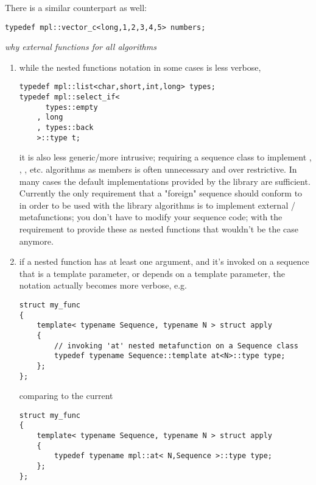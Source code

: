 \documentclass{netobjectdays}
\begin{document}
There is a similar  counterpart as well:

{\footnotesize
\begin{verbatim}
typedef mpl::vector_c<long,1,2,3,4,5> numbers;
\end{verbatim}
}


\emph{why external functions for all algorithms}

\begin{enumerate}
 \item while the nested functions notation in some cases is 
 less verbose, 

{\footnotesize
\begin{verbatim}
typedef mpl::list<char,short,int,long> types;
typedef mpl::select_if<
      types::empty
    , long
    , types::back
    >::type t;
\end{verbatim}
}

it is also less generic/more intrusive; requiring a sequence 
class to implement , , , etc. 
algorithms as members is often unnecessary and over restrictive. 
In many cases the default implementations provided by the library 
are sufficient.
Currently the only requirement that a "foreign" sequence should 
conform to in order to be used with the library algorithms is to 
implement external / metafunctions; you 
don't have to modify your sequence code; with the requirement to 
provide these as nested functions that wouldn't be the case anymore. 

\item if a nested function has at least one argument, and it's 
invoked on a sequence that is a template parameter, or depends 
on a template parameter, the notation actually becomes more 
verbose, e.g. 

{\footnotesize
\begin{verbatim}
struct my_func
{
    template< typename Sequence, typename N > struct apply
    {
        // invoking 'at' nested metafunction on a Sequence class
        typedef typename Sequence::template at<N>::type type;
    };
};
\end{verbatim}
}

comparing to the current 

{\footnotesize
\begin{verbatim}
struct my_func
{
    template< typename Sequence, typename N > struct apply
    {
        typedef typename mpl::at< N,Sequence >::type type;
    };
};
\end{verbatim}
}


\end{enumerate}
\end{document}
